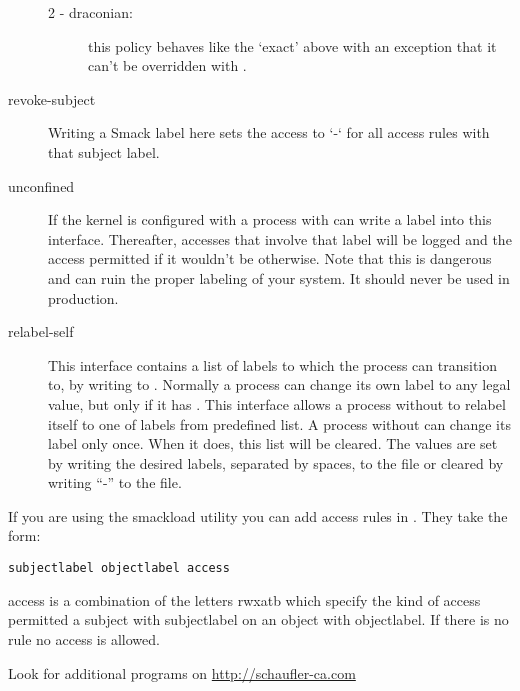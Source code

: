 \documentclass[a4paper,8pt,english]{sphinxmanual}
\begin{document}
\begin{description}
\begin{description}
\item[{2 - draconian:}] \leavevmode
this policy behaves like the `exact' above with an
exception that it can't be overridden with .

\end{description}

\item[{revoke-subject}] \leavevmode
Writing a Smack label here sets the access to `-` for all access
rules with that subject label.

\item[{unconfined}] \leavevmode
If the kernel is configured with 
a process with  can write a label into this interface.
Thereafter, accesses that involve that label will be logged and
the access permitted if it wouldn't be otherwise. Note that this
is dangerous and can ruin the proper labeling of your system.
It should never be used in production.

\item[{relabel-self}] \leavevmode
This interface contains a list of labels to which the process can
transition to, by writing to .
Normally a process can change its own label to any legal value, but only
if it has . This interface allows a process without
 to relabel itself to one of labels from predefined list.
A process without  can change its label only once. When it
does, this list will be cleared.
The values are set by writing the desired labels, separated
by spaces, to the file or cleared by writing ``-'' to the file.

\end{description}

If you are using the smackload utility
you can add access rules in . They take the form:

\begin{Verbatim}[commandchars=\\\{\}]
subjectlabel objectlabel access
\end{Verbatim}

access is a combination of the letters rwxatb which specify the
kind of access permitted a subject with subjectlabel on an
object with objectlabel. If there is no rule no access is allowed.

Look for additional programs on \href{http://schaufler-ca.com}{http://schaufler-ca.com}
\end{document}
